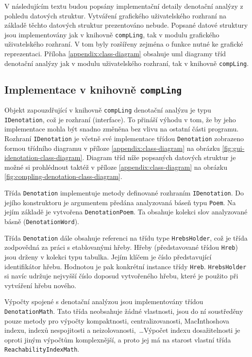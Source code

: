 \documentclass[dp.tex]{subfiles}
\begin{document}
V následujícím textu budou popsány implementační detaily denotační analýzy z pohledu datových struktur. Vytváření grafického uživatelského rozhraní na základě těchto datových struktur prezentováno nebude. Popsané datové struktury jsou implementovány jak v knihovně \texttt{compLing}, tak v modulu grafického uživatelského rozhraní. V tom byly rozšířeny zejména o funkce nutné ke grafické reprezentaci. Příloha \ref{appendix:class-diagram} obsahuje \acrshort{uml} diagramy tříd denotační analýzy jak v modulu uživatelského rozhraní, tak v knihovně \texttt{compLing}.

\subsection{Implementace v knihovně \texttt{compLing}}

Objekt zapouzdřující v knihovně \texttt{compLing} denotační analýzu je typu \texttt{IDenotation}, což je rozhraní (interface). To přináší výhodu v tom, že by jeho implementace mohla být snadno změněna bez vlivu na ostatní části programu. Rozhraní \texttt{IDenotation} je včetně své implementace třídou \texttt{Denotation} zobrazeno formou třídního diagramu v příloze \ref{appendix:class-diagram} na obrázku \ref{fig:gui-idenotation-class-diagram}. Diagram tříd níže popsaných datových struktur je možné si prohlédnout taktéž v příloze \ref{appendix:class-diagram} na obrázku \ref{fig:compling-denotation-class-diagram}.

Třída \texttt{Denotation} implementuje metody definované rozhraním \texttt{IDenotation}. Do jejího konstruktoru je argumentem předána analyzovaná báseň typu \texttt{Poem}. Na jejím základě je vytvořena \texttt{DenotationPoem}. Ta obsahuje kolekci slov analyzované básně (\texttt{DenotationWord}). 

Třída \texttt{Denotation} dále obsahuje referenci na třídu type \texttt{HrebsHolder}, což je třída zodpovědná za práci s etablovanými hřeby. Hřeby (představované třídou \texttt{Hreb}) jsou drženy v kolekci typu tabulka. Jejím klíčem je číslo představující identifikátor hřebu. Hodnotou je pak konkrétní instance třídy \texttt{Hreb}. \texttt{HrebsHolder} si navíc udržuje nejvyšší číslo doposud vytvořeného hřebu, které je použito při vytváření hřebu nového.

Výpočty spojené s denotační analýzou jsou implementovány třídou \texttt{DenotationMath}. Tato třída neobsahuje žádné vlastnosti, jsou do ní soustředěny pouze metody pro výpočty kompaktnosti, centralizovanosti, MacInthoshova indexu, indexů nespojitosti a neizolovanosti,~\ldots Výpočet indexu dosažitelnosti je oproti jiným výpočtům komplexnější, a proto jej má na starost vlastní třída \texttt{ReachabilityIndexMath}.
\end{document}
